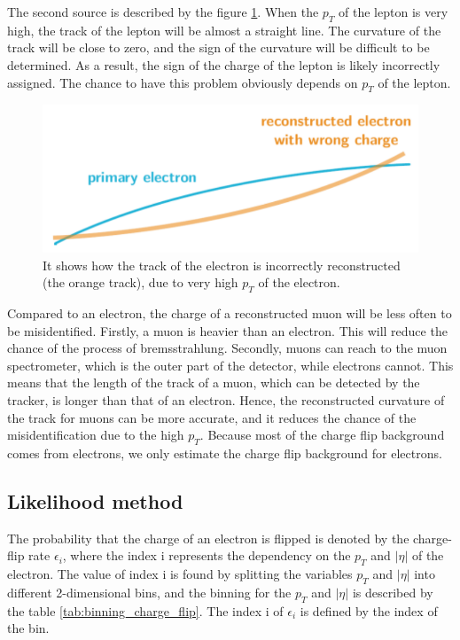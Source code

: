 The second source is described by the figure \ref{fig:charge_flip_high_pt}.
When the $p_T$ of the lepton is very high, the track of the lepton will be almost a straight line.
The curvature of the track will be close to zero, and the sign of the curvature will be difficult to be determined.
As a result, the sign of the charge of the lepton is likely incorrectly assigned.
The chance to have this problem obviously depends on $p_T$ of the lepton.

\begin{figure}
\centering
\includegraphics[width=\textwidth]{data/photo/charge_flip/WrongTrack.png}
\caption{It shows how the track of the electron is incorrectly reconstructed (the orange track), due to very high $p_T$ of the electron.}
\label{fig:charge_flip_high_pt}
\end{figure}

Compared to an electron, the charge of a reconstructed muon will be less often to be misidentified.
Firstly, a muon is heavier than an electron.
This will reduce the chance of the process of bremsstrahlung.
Secondly, muons can reach to the muon spectrometer, which is the outer part of the detector, while electrons cannot.
This means that the length of the track of a muon, which can be detected by the tracker, is longer than that of an electron.
Hence, the reconstructed curvature of the track for muons can be more accurate, and it reduces the chance of the misidentification due to the high $p_T$.
Because most of the charge flip background comes from electrons, we only estimate the charge flip background for electrons.

\subsection{Likelihood method}
\label{sec:likelihood_method}
The probability that the charge of an electron is flipped is denoted by the charge-flip rate $\epsilon_i$, where the index i represents the dependency on the $p_T$ and $|\eta|$ of the electron.
The value of index i is found by splitting the variables $p_T$ and $|\eta|$ into different 2-dimensional bins, and the binning for the $p_T$ and $|\eta|$ is described by the table \ref{tab:binning_charge_flip}. The index i of $\epsilon_i$ is defined by the index of the bin.

